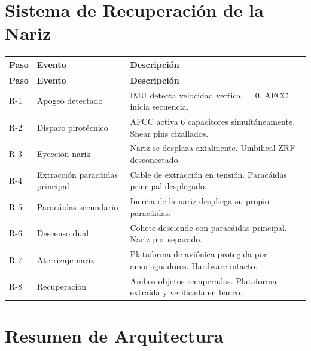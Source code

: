 \documentclass[11pt, a4paper]{article}
\begin{document}
\section{Sistema de Recuperaci\'{o}n de la Nariz}

\begin{longtable}{C{1cm} L{4cm} L{8.5cm}}
  \color{white}\textbf{Paso}&\color{white}\textbf{Evento}&\color{white}\textbf{Descripci\'{o}n}\\
  \endfirsthead
  \color{white}\textbf{Paso}&\color{white}\textbf{Evento}&\color{white}\textbf{Descripci\'{o}n}\\
  \endhead
  R-1 & Apogeo detectado       & IMU detecta velocidad vertical = 0. AFCC inicia secuencia. \\
  R-2 & Disparo pirot\'{e}cnico & AFCC activa 6 capacitores simult\'{a}neamente. Shear pins cizallados. \\
  R-3 & Eyecci\'{o}n nariz      & Nariz se desplaza axialmente. Umbilical ZRF desconectado. \\
  R-4 & Extracci\'{o}n parac\'{a}idas principal & Cable de extracci\'{o}n en tensi\'{o}n. Parac\'{a}idas principal desplegado. \\
  R-5 & Parac\'{a}idas secundario & Inercia de la nariz despliega su propio parac\'{a}idas. \\
  R-6 & Descenso dual           & Cohete desciende con parac\'{a}idas principal. Nariz por separado. \\
  R-7 & Aterrizaje nariz        & Plataforma de avi\'{o}nica protegida por amortiguadores. Hardware intacto. \\
  R-8 & Recuperaci\'{o}n        & Ambos objetos recuperados. Plataforma extra\'{i}da y verificada en banco. \\
\end{longtable}

\section{Resumen de Arquitectura}
\end{document}
